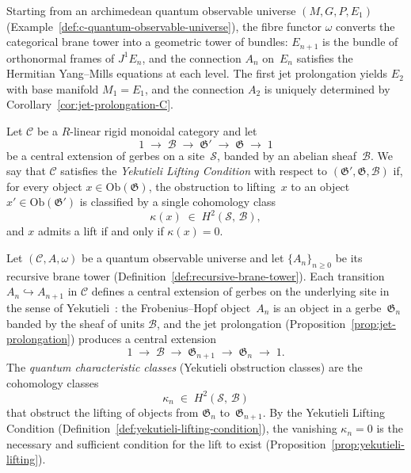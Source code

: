 \begin{example}
\label{ex:brane-tower-levels}
Starting from an archimedean quantum observable universe $(M, G, P, E_1)$
(Example~\ref{def:c-quantum-observable-universe}), the fibre functor
$\omega$ converts the categorical brane tower into a geometric tower of
bundles: $E_{n+1}$ is the bundle of orthonormal frames of $J^1 E_n$, and
the connection $A_n$ on~$E_n$ satisfies the Hermitian Yang--Mills equations
at each level.  The first jet prolongation yields $E_2$ with base manifold
$M_1 = E_1$, and the connection $A_2$ is uniquely determined by
Corollary~\ref{cor:jet-prolongation-C}.
\end{example}


\begin{definition}
\label{def:yekutieli-lifting-condition}
Let $\mathcal{C}$ be a $R$-linear rigid monoidal category and let
\[
  1 \;\longrightarrow\; \mathcal{B}
  \;\longrightarrow\; \mathfrak{G}'
  \;\longrightarrow\; \mathfrak{G}
  \;\longrightarrow\; 1
\]
be a central extension of gerbes on a site~$\mathcal{S}$, banded by an
abelian sheaf~$\mathcal{B}$.  We say that $\mathcal{C}$ satisfies the
\emph{Yekutieli Lifting Condition} with respect to
$(\mathfrak{G}', \mathfrak{G}, \mathcal{B})$ if, for every object
$x \in \mathrm{Ob}(\mathfrak{G})$, the obstruction to lifting~$x$ to an
object $x' \in \mathrm{Ob}(\mathfrak{G}')$ is classified by a single
cohomology class
\[
  \kappa(x) \;\in\; H^2(\mathcal{S},\, \mathcal{B}),
\]
and $x$ admits a lift if and only if $\kappa(x) = 0$.
\end{definition}

\begin{definition}
\label{def:quantum-characteristic-classes}
Let $(\mathcal{C}, A, \omega)$ be a quantum observable universe and let
$\{A_n\}_{n \geq 0}$ be its recursive brane tower
(Definition~\ref{def:recursive-brane-tower}).  Each transition
$A_n \hookrightarrow A_{n+1}$ in $\mathcal{C}$ defines a central extension
of gerbes on the underlying site in the sense of
Yekutieli~\cite{yekutieli2010}: the Frobenius--Hopf object~$A_n$ is an
object in a gerbe~$\mathfrak{G}_n$ banded by the sheaf of units
$\mathcal{B}$, and the jet prolongation
(Proposition~\ref{prop:jet-prolongation}) produces a central extension
\[
  1 \;\longrightarrow\; \mathcal{B}
  \;\longrightarrow\; \mathfrak{G}_{n+1}
  \;\longrightarrow\; \mathfrak{G}_n
  \;\longrightarrow\; 1.
\]
The \emph{quantum characteristic classes} (Yekutieli obstruction classes)
are the cohomology classes
\[
  \kappa_n \;\in\; H^2(\mathcal{S},\, \mathcal{B})
\]
that obstruct the lifting of objects from $\mathfrak{G}_n$
to~$\mathfrak{G}_{n+1}$.  By the Yekutieli Lifting Condition
(Definition~\ref{def:yekutieli-lifting-condition}), the vanishing
$\kappa_n = 0$ is the necessary and sufficient condition for the lift
to exist (Proposition~\ref{prop:yekutieli-lifting}).
\end{definition}

